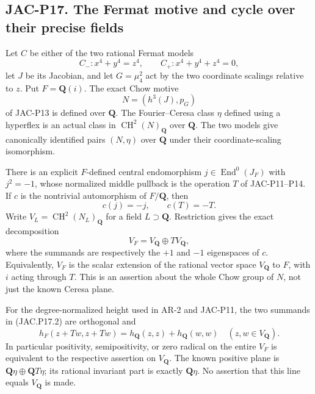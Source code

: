 
\subsection*{JAC-P17. The Fermat motive and cycle over their precise fields}

\begin{proposition}[JAC-P17]\label{jac:P17}
Let $C$ be either of the two rational Fermat models
\[
 C_-:x^4+y^4=z^4,\qquad C_+:x^4+y^4+z^4=0,
\]
let $J$ be its Jacobian, and let $G=\mu_4^2$ act by the two
coordinate scalings relative to $z$. Put $F=\mathbf Q(i)$.
The exact Chow motive
\[
                    N=(h^3(J),p_G)
\]
of JAC-P13 is defined over $\mathbf Q$. The Fourier--Ceresa
class $\eta$ defined using a hyperflex is an actual class in
$\operatorname{CH}^2(N)_{\mathbf Q}$ over $\mathbf Q$.
The two models give canonically identified pairs $(N,\eta)$
over $\mathbf Q$ under their coordinate-scaling isomorphism.

There is an explicit $F$-defined central endomorphism
$j\in\operatorname{End}^0(J_F)$ with $j^2=-1$, whose normalized
middle pullback is the operation $T$ of JAC-P11--P14.
If $c$ is the nontrivial automorphism of $F/\mathbf Q$, then
\[
                  c(j)=-j,\qquad c(T)=-T.              \tag{JAC.P17.1}
\]
Write $V_L=\operatorname{CH}^2(N_L)_{\mathbf Q}$ for a field
$L\supset\mathbf Q$. Restriction gives the exact decomposition
\[
                  V_F=V_{\mathbf Q}\oplus T V_{\mathbf Q},
                                                               \tag{JAC.P17.2}
\]
where the summands are respectively the $+1$ and $-1$
eigenspaces of $c$. Equivalently, $V_F$ is the scalar extension
of the rational vector space $V_{\mathbf Q}$ to $F$, with
$i$ acting through $T$. This is an assertion about the whole
Chow group of $N$, not just the known Ceresa plane.

For the degree-normalized height used in AR-2 and JAC-P11,
the two summands in (JAC.P17.2) are orthogonal and
\[
 h_F(z+Tw,z+Tw)=h_{\mathbf Q}(z,z)+h_{\mathbf Q}(w,w)
       \quad(z,w\in V_{\mathbf Q}).                   \tag{JAC.P17.3}
\]
In particular positivity, semipositivity, or zero radical on
the entire $V_F$ is equivalent to the respective assertion on
$V_{\mathbf Q}$. The known positive plane is
$\mathbf Q\eta\oplus\mathbf Q T\eta$; its rational invariant
part is exactly $\mathbf Q\eta$.
No assertion that this line equals $V_{\mathbf Q}$ is made.
\end{proposition}

